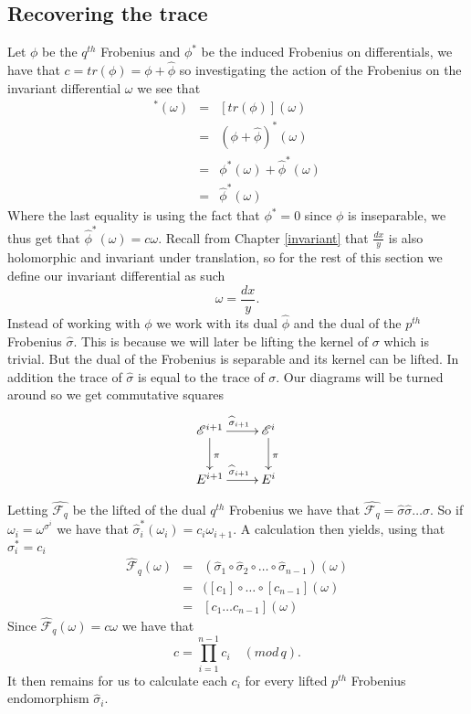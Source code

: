 \subsection{Recovering the trace}
Let $\phi$ be the $q^{th}$ Frobenius and $\phi^*$ be the induced Frobenius on differentials, 
we have that $c = tr(\phi) = \phi + \widehat{\phi}$ so investigating the
action of the Frobenius on the invariant differential $\omega$ we see that
\begin{eqnarray}
 [tr(\phi)]^*(\omega)&=& [tr(\phi)](\omega) \nonumber \\
		     &=& (\phi + \widehat{\phi})^*(\omega) \nonumber \\
		     &=& \phi^*(\omega) + \widehat{\phi}^*(\omega) \nonumber \\
		     &=& \widehat{\phi}^*(\omega) \nonumber
\end{eqnarray}
Where the last equality is using the fact that $\phi^* = 0$ since $\phi$ is inseparable, we thus
get that $\widehat{\phi}^*(\omega) = c\omega$.
Recall from Chapter \ref{invariant} that $\frac{dx}{y}$ is also holomorphic and invariant under translation,
so for the rest of this section we define our invariant differential as such
$$ \omega = \frac{dx}{y}. $$
Instead of working with $\phi$ we work with its dual $\widehat{\phi}$ and the dual
of the $p^{th}$ Frobenius $\widehat{\sigma}$. This is because we will later
be lifting the kernel of $\sigma$ which is trivial. But the dual of the Frobenius is separable
and its kernel can be lifted. In addition the trace of $\widehat{\sigma}$ is equal to the trace of $\sigma$.
Our diagrams will be turned around so we get commutative
squares
$$
\xymatrix {
  \mathscr{E}^{i+1} \ar[r]^{\widehat{\sigma}_{i+1}} \ar[d]^\pi & \mathscr{E}^i \ar[d]^\pi \\
  E^{i+1} \ar[r]^{\widehat{\sigma}_{i+1}} & E^i 
}
$$

Letting $\widehat{\mathscr{F}_q}$ be the lifted of the dual $q^{th}$ Frobenius we have that
$\widehat{\mathscr{F}_q} = \widehat{\sigma} \widehat{\sigma} \ldots \widehat{\sigma}$.
So if $\omega_i = \omega^{\sigma^i}$ we have that $\widehat{\sigma}_i^*(\omega_i) = c_i \omega_{i+1}$.
A calculation then yields, using that $\sigma_i^* = c_i$
\begin{eqnarray}
  \widehat{\mathscr{F}}_q(\omega) &=& (\widehat{\sigma}_1 \circ \widehat{\sigma}_2 \circ \ldots \circ \widehat{\sigma}_{n-1})(\omega) \nonumber \\
			      &=& ([c_1] \circ \ldots \circ [c_{n-1}](\omega) \nonumber \\
			      &=& [c_1\ldots c_{n-1}](\omega) \nonumber
\end{eqnarray}
Since $\widehat{\mathscr{F}}_q(\omega) = c \omega$ we have that
$$ c = \prod_{i=1}^{n-1} c_i \quad (mod\, q). $$
It then remains for us to calculate each $c_i$ for every lifted $p^{th}$ Frobenius
endomorphism $\widehat{\sigma}_i$.

